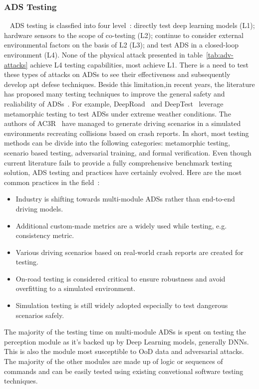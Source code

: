\documentclass[a4paper]{article}
\begin{document}
\subsubsection{ADS Testing}~\label{sec:ads-testing}
ADS testing is classfied into four level~\cite{abrecht2021testing}: directly test deep learning models (L1); hardware sensors to the scope of co-testing (L2); continue to consider external environmental factors on the basis of L2 (L3); and test ADS in a closed-loop environment (L4). None of the physical attack presented in table~\ref{tab:adv-attacks} achieve L4 testing capabilities, most achieve L1. There is a need to test these types of attacks on ADSs to see their effectiveness and subsequently develop apt defese techniques. 
Beside this limitation,in recent years, the literature has proposed many testing techniques to improve the general safety and realiability of ADSs~\cite{abdessalem2018testing,zhang2018deeproad,tian2018deeptest,huynh2019ac3r,abdessalem2018testing1,calo2020generating,chandrasekaran2021combinatorial,du2021towards,gambi2019automatically,ishikawa2020testing}. For example, DeepRoad~\cite{zhang2018deeproad} and DeepTest~\cite{tian2018deeptest} leverage metamorphic testing to test ADSs under extreme weather conditions. The authors of AC3R~\cite{huynh2019ac3r} have managed to generate driving scenarios in a simulated environments recreating collisions based on crash reports. In short, most testing methods can be divide into the following categories: metamorphic testing, scenario based testing, adversarial training, and formal verification. Even though current literature fails to provide a fully comprehensive benchmark testing solution, ADS testing and practices have certainly evolved. Here are the most common practices in the field~\cite{lou2022testing}:
\begin{itemize}
  \item Industry is shifting towards multi-module ADSs rather than end-to-end driving models.
  \item Additional custom-made metrics are a widely used while testing, e.g\@. consistency metric.
  \item Various driving scenarios based on real-world crash reports are created for testing.
  \item On-road testing is considered critical to ensure robustness and avoid overfitting to a simulated environment.
  \item Simulation testing is still widely adopted especially to test dangerous scenarios safely.
\end{itemize}
\noindent
The majority of the testing time on multi-module ADSs is spent on testing the perception module as it's backed up by Deep Learning models, generally DNNs. This is also the module most susceptible to OoD data and adversarial attacks. The majority of the other modules are made up of logic or sequences of commands and can be easily tested using existing convetional software testing techniques.
\end{document}
